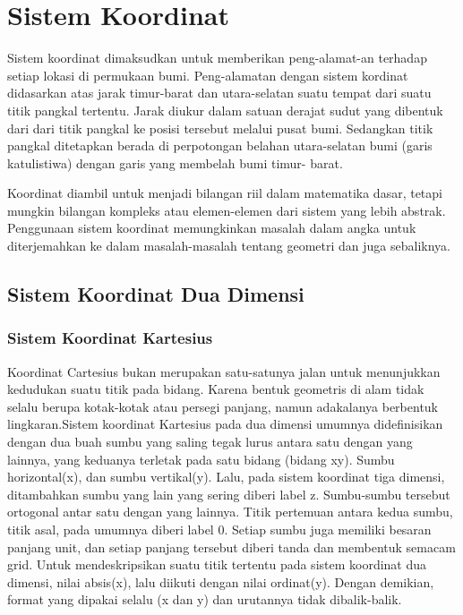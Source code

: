 \section{Sistem Koordinat}
Sistem koordinat dimaksudkan untuk memberikan peng-alamat-an terhadap setiap lokasi di permukaan bumi. Peng-alamatan dengan sistem kordinat didasarkan atas jarak timur-barat dan utara-selatan suatu tempat dari suatu titik pangkal tertentu. Jarak diukur dalam satuan derajat sudut yang dibentuk dari dari titik pangkal ke posisi tersebut melalui pusat bumi. Sedangkan titik pangkal ditetapkan berada di
perpotongan belahan utara-selatan bumi (garis katulistiwa) dengan garis yang membelah bumi timur- barat\cite{zuhdi2012sistem}.

Koordinat diambil untuk menjadi bilangan riil dalam matematika dasar, tetapi mungkin bilangan kompleks atau elemen-elemen dari sistem yang lebih abstrak. Penggunaan sistem koordinat memungkinkan masalah dalam angka untuk diterjemahkan ke dalam masalah-masalah tentang geometri dan juga sebaliknya.

\subsection{Sistem Koordinat Dua Dimensi}
\subsubsection{Sistem Koordinat Kartesius}
Koordinat Cartesius bukan merupakan satu-satunya jalan untuk menunjukkan kedudukan suatu titik pada bidang. Karena bentuk geometris di alam tidak selalu berupa kotak-kotak atau persegi panjang, namun adakalanya berbentuk lingkaran\cite{mufidah2015solusi}.Sistem koordinat Kartesius pada dua dimensi umumnya didefinisikan dengan dua buah sumbu yang saling tegak lurus antara satu dengan yang lainnya, yang keduanya terletak pada satu bidang (bidang xy). Sumbu horizontal(x), dan sumbu vertikal(y). Lalu, pada sistem koordinat tiga dimensi, ditambahkan sumbu yang lain yang sering diberi label z. Sumbu-sumbu tersebut ortogonal antar satu dengan yang lainnya. Titik pertemuan antara kedua sumbu, titik asal, pada umumnya diberi label 0. Setiap sumbu juga memiliki besaran panjang unit, dan setiap panjang tersebut diberi tanda dan membentuk semacam grid. Untuk mendeskripsikan suatu titik tertentu pada sistem koordinat dua dimensi, nilai absis(x), lalu diikuti dengan nilai ordinat(y). Dengan demikian, format yang dipakai selalu (x dan y) dan urutannya tidak dibalik-balik.

